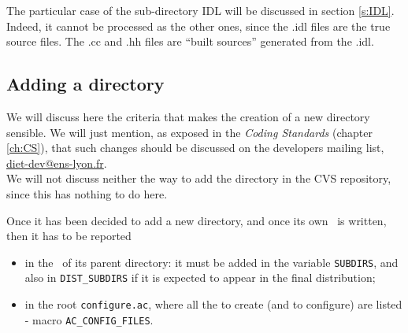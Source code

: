 \noindent
{} The particular case of the sub-directory
\textsf{IDL} will be discussed in section \ref{s:IDL}. Indeed, it
cannot be processed as the other ones, since the \textsf{.idl} files
are the true source files. The \textsf{.cc} and \textsf{.hh} files are
``built sources'' generated from the \textsf{.idl}.



\subsection{Adding a directory}

We will discuss here the criteria that makes the creation of a new
directory sensible. We will just mention, as exposed in the
\textit{Coding Standards} (chapter \ref{ch:CS}), that such changes
should be discussed on the developers mailing list,
\url{diet-dev@ens-lyon.fr}.  \\ We will not discuss neither the way to
add the directory in the CVS repository, since this has nothing to do
here.

Once it has been decided to add a new directory, and once its own
\makeam\ is written, then it has to be reported
\begin{itemize}
\item in the \makeam\ of its parent directory: it must be added in the
  variable \texttt{SUBDIRS}, and also in \texttt{DIST\_SUBDIRS} if it
  is expected to appear in the final distribution;
\item in the root \texttt{configure.ac}, where all the \makein to
  create (and to configure) are listed - macro
  \texttt{AC\_CONFIG\_FILES}.
\end{itemize}

